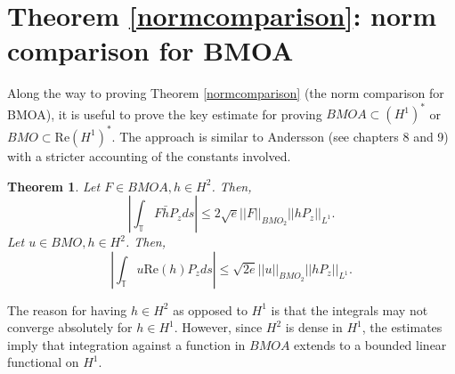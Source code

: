 \documentclass[12pt]{amsart}
\newtheorem{theorem}{Theorem}[section]
\newtheorem{lemma}[theorem]{Lemma}
\theoremstyle{definition}
\theoremstyle{remark}
\numberwithin{equation}{section}
\newcommand{\T}{\mathbb{T}}
\begin{document}

\section{Theorem \ref{normcomparison}: norm comparison for BMOA}

Along the way to proving Theorem \ref{normcomparison} (the norm
comparison for BMOA), it is useful to prove the key estimate for
proving $BMOA \subset (H^1)^*$ or $BMO \subset \text{Re}(H^1)^*$.  The
approach is similar to Andersson \cite{mA97} (see chapters 8 and 9)
with a stricter accounting of the constants involved.

\begin{theorem} \label{mainthm} Let $F \in BMOA, h \in H^2$.  Then,
\[
\left| \int_{\T} F \bar{h} P_z ds \right| \leq 2\sqrt{e} ||F||_{BMO_2} ||h
P_z||_{L^1}.
\]
Let $u \in BMO, h \in H^2$. Then,
\[
\left| \int_{\T}  u \text{Re}(h) P_z ds \right| \leq \sqrt{2e} ||u||_{BMO_2}
||h P_z||_{L^1}.
\]
\end{theorem}

The reason for having $h \in H^2$ as opposed to $H^1$ is that the
integrals may not converge absolutely for $h\in H^1$. However, since
$H^2$ is dense in $H^1$, the estimates imply that integration against
a function in $BMOA$ extends to a bounded linear functional on $H^1$.
\end{document}
